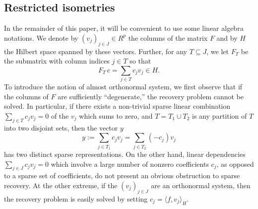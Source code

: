 \documentclass[11pt]{article}
\newcommand{\<}{\langle}
\renewcommand{\>}{\rangle}
\numberwithin{equation}{section}
\begin{document}



\subsection{Restricted isometries}

In the remainder of this paper, it will be convenient to use some
linear algebra notations. We denote by $(v_j)_{j \in J} \in R^p$ the
columns of the matrix $F$ and by $H$ the Hilbert space spanned by
these vectors. Further, for any $T \subseteq J$, we let $F_T$ be the
submatrix with column indices $j \in T$ so that
$$
F_T \, c = \sum_{j \in T} c_j v_j \in H. 
$$
To introduce the notion of almost orthonormal system, we first
observe that if the columns of $F$ are sufficiently ``degenerate,''
the recovery problem cannot be solved. In particular, if there exists
a non-trivial sparse linear combination $\sum_{j \in T} c_j v_j = 0$
of the $v_j$ which sums to zero, and $T = T_1 \cup T_2$ is any
partition of $T$ into two disjoint sets, then the vector $y$
$$
y := \sum_{j \in T_1} c_j v_j = \sum_{j \in T_2} (-c_j) v_j
$$
has two distinct sparse representations.  
On the other hand, linear dependencies $\sum_{j \in J} c_j v_j = 0$
which involve a large number of nonzero coefficients $c_j$, as
opposed to a sparse set of coefficients, do not present an obvious
obstruction to sparse recovery. %
At the other extreme, if the $(v_j)_{j \in J}$ are an orthonormal
system, then the recovery problem is easily solved by setting $c_j =
\langle f, v_j \rangle_H$.

\end{document}
